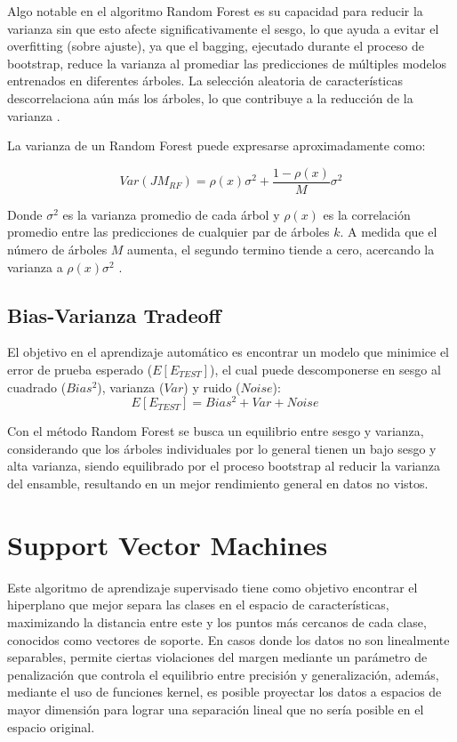 			Algo notable en el algoritmo Random Forest es su capacidad para reducir la varianza sin que esto afecte significativamente el sesgo, lo que ayuda a evitar el overfitting (sobre ajuste), ya que el bagging, ejecutado durante el proceso de bootstrap, reduce la varianza al promediar las predicciones de múltiples modelos entrenados en diferentes árboles. La selección aleatoria de características descorrelaciona aún más los árboles, lo que contribuye a la reducción de la varianza \citep{breiman2001,veirana2021}.
			
			La varianza de un Random Forest puede expresarse aproximadamente como:
			
				\begin{equation}
					Var ( JM_{RF} ) = \rho(x)\sigma^2 + \frac{1 - \rho(x)}{M}\sigma^2
				\end{equation} 
				
			Donde $\sigma^2$ es la varianza promedio de cada árbol y $\rho(x)$ es la correlación promedio entre las predicciones de cualquier par de árboles $k$. A medida que el número de árboles $M$ aumenta, el segundo termino tiende a cero, acercando la varianza a $\rho(x)\sigma^2$ \citep{breiman2001,veirana2021}.
			
		\subsection{Bias-Varianza Tradeoff}
		
		El objetivo en el aprendizaje automático es encontrar un modelo que minimice el error de prueba esperado ($E[E_{TEST}]$)\citep{breiman2001}, el cual puede descomponerse en sesgo al cuadrado ($Bias^2$), varianza ($Var$) y ruido ($Noise$): $$E[E_{TEST}] = Bias^2 + Var + Noise \quad$$
		
		Con el método Random Forest se busca un equilibrio entre sesgo y varianza, considerando que los árboles individuales por lo general tienen un bajo sesgo y alta varianza, siendo equilibrado por el proceso bootstrap al reducir la varianza del ensamble, resultando en un mejor rendimiento general en datos no vistos\citep{breiman2001}.
		
		
	\section{Support Vector Machines} 
	
	Este algoritmo de aprendizaje supervisado tiene como objetivo encontrar el hiperplano que mejor separa las clases en el espacio de características, maximizando la distancia entre este y los puntos más cercanos de cada clase, conocidos como vectores de soporte. En casos donde los datos no son linealmente separables, permite ciertas violaciones del margen mediante un parámetro de penalización que controla el equilibrio entre precisión y generalización, además, mediante el uso de funciones kernel, es posible proyectar los datos a espacios de mayor dimensión para lograr una separación lineal que no sería posible en el espacio original\citep{james2013, veirana2021}.
	
